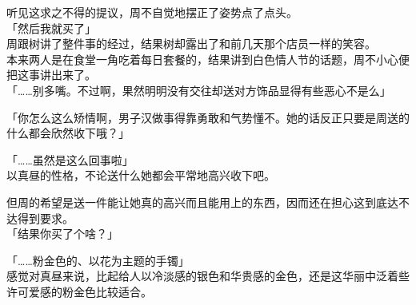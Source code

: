 听见这求之不得的提议，周不自觉地摆正了姿势点了点头。\\



「然后我就买了」\\

周跟树讲了整件事的经过，结果树却露出了和前几天那个店员一样的笑容。\\

本来两人是在食堂一角吃着每日套餐的，结果讲到白色情人节的话题，周不小心便把这事讲出来了。\\

「……别多嘴。不过啊，果然明明没有交往却送对方饰品显得有些恶心不是么」

「你怎么这么矫情啊，男子汉做事得靠勇敢和气势懂不。她的话反正只要是周送的什么都会欣然收下哦？」

「……虽然是这么回事啦」\\

以真昼的性格，不论送什么她都会平常地高兴收下吧。

但周的希望是送一件能让她真的高兴而且能用上的东西，因而还在担心这到底达不达得到要求。\\

「结果你买了个啥？」

「……粉金色的、以花为主题的手镯」\\

感觉对真昼来说，比起给人以冷淡感的银色和华贵感的金色，还是这华丽中泛着些许可爱感的粉金色比较适合。\\

